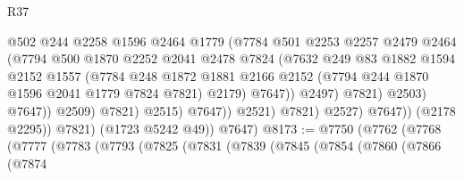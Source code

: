 \begin{lexlean}{R37}
\begin{coremodule}
                                        @502
                                        @244
                                        @2258
                                        @1596
                                        @2464
                                        @1779
                                        (@7784
                                          @501
                                          @2253
                                          @2257
                                          @2479
                                          @2464
                                          (@7794
                                            @500
                                            @1870
                                            @2252
                                            @2041
                                            @2478
                                            @7824
                                            (@7632
                                              @249
                                              @83
                                              @1882
                                              @1594
                                              @2152
                                              @1557
                                              (@7784
                                                @248
                                                @1872
                                                @1881
                                                @2166
                                                @2152
                                                (@7794 @244 @1870 @1596 @2041 @1779 @7824 @7821)
                                                @2179)
                                              @7647))
                                          @2497)
                                        @7821)
                                      @2503)
                                    @7647))
                                @2509)
                              @7821)
                            @2515)
                          @7647))
                      @2521)
                    @7821)
                  @2527)
                @7647))
            (@2178 @2295))
          @7821)
        (@1723 @5242 @49))
      @7647)
@8173 := @7750
    (@7762
      (@7768
        (@7777
          (@7783
            (@7793
              (@7825
                (@7831
                  (@7839
                    (@7845
                      (@7854
                        (@7860
                          (@7866
                            (@7874

\end{coremodule}
\end{lexlean}
